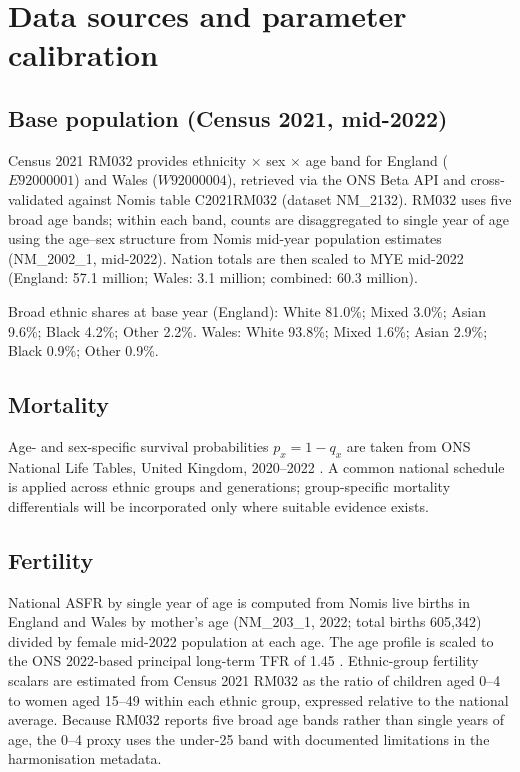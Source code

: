 \documentclass[12pt,a4paper]{article}
\begin{document}
\section{Data sources and parameter calibration}

\subsection{Base population (Census 2021, mid-2022)}

Census 2021 RM032 provides ethnicity $\times$ sex $\times$ age band for England
($E92000001$) and Wales ($W92000004$), retrieved via the ONS Beta API and cross-validated
against Nomis table C2021RM032 (dataset NM\_2132). RM032 uses five broad age bands; within
each band, counts are disaggregated to single year of age using the age--sex structure from
Nomis mid-year population estimates (NM\_2002\_1, mid-2022). Nation totals are then scaled
to MYE mid-2022 (England: 57.1 million; Wales: 3.1 million; combined: 60.3 million).

Broad ethnic shares at base year (England): White 81.0\%; Mixed 3.0\%; Asian 9.6\%; Black
4.2\%; Other 2.2\%. Wales: White 93.8\%; Mixed 1.6\%; Asian 2.9\%; Black 0.9\%; Other 0.9\%.

\subsection{Mortality}

Age- and sex-specific survival probabilities $p_x = 1 - q_x$ are taken from ONS National Life
Tables, United Kingdom, 2020--2022 \citep{ons2024lifetables}. A common national schedule is
applied across ethnic groups and generations; group-specific mortality differentials will be
incorporated only where suitable evidence exists.

\subsection{Fertility}

National ASFR by single year of age is computed from Nomis live births in England and Wales
by mother's age (NM\_203\_1, 2022; total births 605,342) divided by female mid-2022
population at each age. The age profile is scaled to the ONS 2022-based principal long-term
TFR of 1.45 \citep{ons2024nppvariants}. Ethnic-group fertility scalars are estimated from
Census 2021 RM032 as the ratio of children aged 0--4 to women aged 15--49 within each ethnic
group, expressed relative to the national average. Because RM032 reports five broad age bands
rather than single years of age, the 0--4 proxy uses the under-25 band with documented
limitations in the harmonisation metadata.
\end{document}
